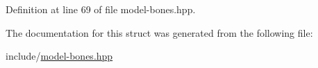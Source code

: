 Definition at line 69 of file model-\/bones.\+hpp.



The documentation for this struct was generated from the following file\+:\begin{DoxyCompactItemize}
\item 
include/\hyperlink{model-bones_8hpp}{model-\/bones.\+hpp}\end{DoxyCompactItemize}
